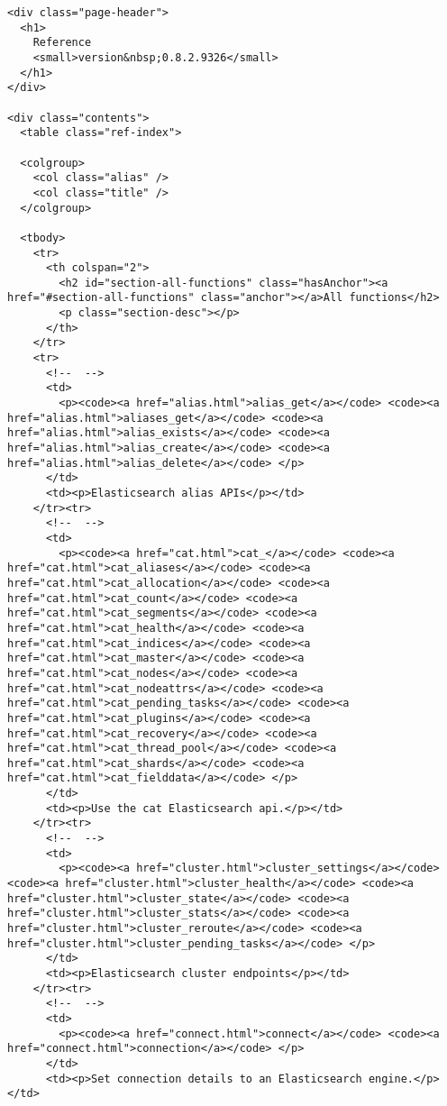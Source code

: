 \documentclass[]{article}
\begin{document}
\begin{verbatim}
<div class="page-header">
  <h1>
    Reference
    <small>version&nbsp;0.8.2.9326</small>
  </h1>
</div>

<div class="contents">
  <table class="ref-index">

  <colgroup>
    <col class="alias" />
    <col class="title" />
  </colgroup>

  <tbody>
    <tr>
      <th colspan="2">
        <h2 id="section-all-functions" class="hasAnchor"><a href="#section-all-functions" class="anchor"></a>All functions</h2>
        <p class="section-desc"></p>
      </th>
    </tr>
    <tr>
      <!--  -->
      <td>
        <p><code><a href="alias.html">alias_get</a></code> <code><a href="alias.html">aliases_get</a></code> <code><a href="alias.html">alias_exists</a></code> <code><a href="alias.html">alias_create</a></code> <code><a href="alias.html">alias_delete</a></code> </p>
      </td>
      <td><p>Elasticsearch alias APIs</p></td>
    </tr><tr>
      <!--  -->
      <td>
        <p><code><a href="cat.html">cat_</a></code> <code><a href="cat.html">cat_aliases</a></code> <code><a href="cat.html">cat_allocation</a></code> <code><a href="cat.html">cat_count</a></code> <code><a href="cat.html">cat_segments</a></code> <code><a href="cat.html">cat_health</a></code> <code><a href="cat.html">cat_indices</a></code> <code><a href="cat.html">cat_master</a></code> <code><a href="cat.html">cat_nodes</a></code> <code><a href="cat.html">cat_nodeattrs</a></code> <code><a href="cat.html">cat_pending_tasks</a></code> <code><a href="cat.html">cat_plugins</a></code> <code><a href="cat.html">cat_recovery</a></code> <code><a href="cat.html">cat_thread_pool</a></code> <code><a href="cat.html">cat_shards</a></code> <code><a href="cat.html">cat_fielddata</a></code> </p>
      </td>
      <td><p>Use the cat Elasticsearch api.</p></td>
    </tr><tr>
      <!--  -->
      <td>
        <p><code><a href="cluster.html">cluster_settings</a></code> <code><a href="cluster.html">cluster_health</a></code> <code><a href="cluster.html">cluster_state</a></code> <code><a href="cluster.html">cluster_stats</a></code> <code><a href="cluster.html">cluster_reroute</a></code> <code><a href="cluster.html">cluster_pending_tasks</a></code> </p>
      </td>
      <td><p>Elasticsearch cluster endpoints</p></td>
    </tr><tr>
      <!--  -->
      <td>
        <p><code><a href="connect.html">connect</a></code> <code><a href="connect.html">connection</a></code> </p>
      </td>
      <td><p>Set connection details to an Elasticsearch engine.</p></td>

\end{verbatim}
\end{document}
